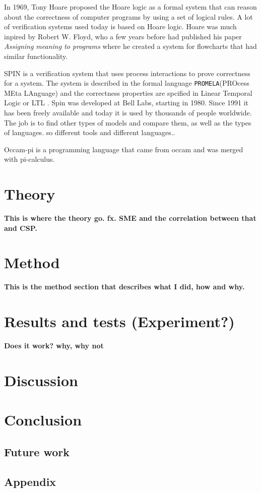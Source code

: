\documentclass[a4paper]{report}
\begin{document}
In 1969, Tony Hoare proposed the Hoare logic\cite{Hoare1969} as a formal system that can reason about the correctness of computer programs by using a set of logical rules. A lot of verification systems used today is based on Hoare logic. Hoare was much inpired by Robert W. Floyd, who a few years before had published his paper \textit{Assigning meaning to programs}\cite{Floyd1967} where he created a system for flowcharts that had similar functionality. 




SPIN  is a verification system that uses process interactions to prove correctness for a system. The system is described in the formal language \texttt{PROMELA}(PROcess MEta LAnguage) and the correctness properties are spcified in Linear Temporal Logic or LTL . Spin was developed at Bell Labs, starting in 1980. Since 1991 it has been freely available and today it is used by thousands of people worldwide.\\
The job is to find other types of models and compare them, as well as the types of languages. so different tools and different languages.. 

Occam-pi is a programming language that came from occam and was merged with pi-calculus. 


\chapter{Theory}
\textbf{This is where the theory go. fx. SME and the correlation between that and CSP.}
\chapter{Method}
\textbf{This is the method section that describes what I did, how and why.}
\chapter{Results and tests (Experiment?)}
\textbf{Does it work? why, why not}
\chapter{Discussion}

\chapter{Conclusion}
\section{Future work}

\newpage



\section{Appendix}
\end{document}
